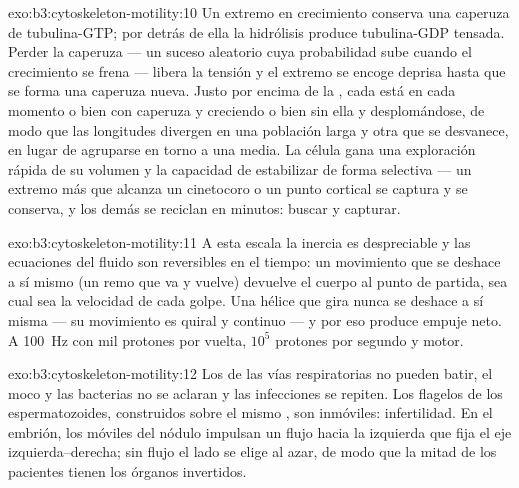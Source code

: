 \begin{solution}{exo:b3:cytoskeleton-motility:10}
Un extremo en crecimiento conserva una caperuza de tubulina-GTP; por
detrás de ella la hidrólisis produce tubulina-GDP tensada. Perder la
caperuza --- un suceso aleatorio cuya probabilidad sube cuando el
crecimiento se frena --- libera la tensión y el extremo se encoge deprisa
hasta que se forma una caperuza nueva. Justo por encima de la
, cada  está en cada momento o bien con
caperuza y creciendo o bien sin ella y desplomándose, de modo que las
longitudes divergen en una población larga y otra que se desvanece, en
lugar de agruparse en torno a una media. La célula gana una exploración
rápida de su volumen y la capacidad de estabilizar de forma selectiva ---
un extremo más que alcanza un cinetocoro o un punto cortical se captura y
se conserva, y los demás se reciclan en minutos: buscar y capturar.
\end{solution}

\begin{solution}{exo:b3:cytoskeleton-motility:11}
A esta escala la inercia es despreciable y las ecuaciones del fluido son
reversibles en el tiempo: un movimiento que se deshace a sí mismo (un
remo que va y vuelve) devuelve el cuerpo al punto de partida, sea cual
sea la velocidad de cada golpe. Una hélice que gira nunca se deshace a sí
misma --- su movimiento es quiral y continuo --- y por eso produce empuje
neto. A \qty{100}{Hz} con mil protones por vuelta, $10^{5}$ protones por
segundo y motor.
\end{solution}

\begin{solution}{exo:b3:cytoskeleton-motility:12}
Los  de las vías respiratorias no pueden batir, el moco y las
bacterias no se aclaran y las infecciones se repiten. Los flagelos de los
espermatozoides, construidos sobre el mismo , son inmóviles:
infertilidad. En el embrión, los  móviles del nódulo impulsan un
flujo hacia la izquierda que fija el eje izquierda--derecha; sin flujo el
lado se elige al azar, de modo que la mitad de los pacientes tienen los
órganos invertidos.
\end{solution}


